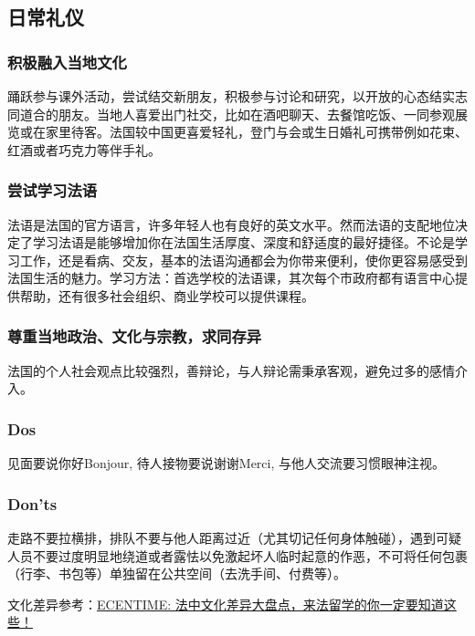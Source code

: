 \subsection{日常礼仪}

\subsubsection{积极融入当地文化}
踊跃参与课外活动，尝试结交新朋友，积极参与讨论和研究，以开放的心态结实志同道合的朋友。当地人喜爱出门社交，比如在酒吧聊天、去餐馆吃饭、一同参观展览或在家里待客。法国较中国更喜爱轻礼，登门与会或生日婚礼可携带例如花束、红酒或者巧克力等伴手礼。

\subsubsection{尝试学习法语}
法语是法国的官方语言，许多年轻人也有良好的英文水平。然而法语的支配地位决定了学习法语是能够增加你在法国生活厚度、深度和舒适度的最好捷径。不论是学习工作，还是看病、交友，基本的法语沟通都会为你带来便利，使你更容易感受到法国生活的魅力。学习方法：首选学校的法语课，其次每个市政府都有语言中心提供帮助，还有很多社会组织、商业学校可以提供课程。

\subsubsection{尊重当地政治、文化与宗教，求同存异}
法国的个人社会观点比较强烈，善辩论，与人辩论需秉承客观，避免过多的感情介入。

\subsubsection{Dos}
见面要说你好Bonjour, 待人接物要说谢谢Merci, 与他人交流要习惯眼神注视。

\subsubsection{Don'ts}
走路不要拉横排，排队不要与他人距离过近（尤其切记任何身体触碰），遇到可疑人员不要过度明显地绕道或者露怯以免激起坏人临时起意的作恶，不可将任何包裹（行李、书包等）单独留在公共空间（去洗手间、付费等）。

文化差异参考：\href{https://www.ecentime.com/article/difference-culturelle}{ECENTIME: 法中文化差异大盘点，来法留学的你一定要知道这些！}
